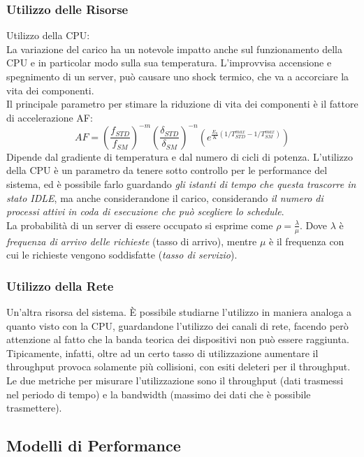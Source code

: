 \documentclass{article}
\begin{document}
		\subsubsection{Utilizzo delle Risorse}\label{utilizzo-delle-risorse}
		Utilizzo della CPU:\\
		La variazione del carico ha un notevole impatto anche sul
		funzionamento della CPU e in particolar modo sulla sua
		temperatura. L'improvvisa accensione e spegnimento di un
		server, può causare uno shock termico, che va a
		accorciare la vita dei componenti.\\
		Il principale parametro per stimare la riduzione di vita dei componenti è il fattore di accelerazione AF:
		\[
		AF = (\frac{f_{STD}}{f_{SM}})^{-m} (\frac{\delta_{STD}}{\delta_{SM}})^{-n}  (e^{\frac{E_a}{K}(1/T^{max}_{STD}-1/T^{max}_{SM})})
		\]
		Dipende dal gradiente di temperatura e dal numero di cicli di potenza.
		L'utilizzo della CPU è un parametro da tenere sotto controllo per le performance del sistema,
		ed è possibile farlo guardando \emph{gli istanti di tempo che questa
		trascorre in stato IDLE}, ma anche considerandone il carico,
		considerando \emph{il numero di processi attivi in coda di esecuzione
		che può scegliere lo schedule}.\\
		La probabilità di un server di essere occupato si esprime come
		\(\rho = \frac{\lambda}{\mu}\). Dove \(\lambda\) è \emph{frequenza di
		arrivo delle richieste} (tasso di arrivo), mentre \(\mu\) è il
		frequenza con cui le richieste vengono soddisfatte (\emph{tasso
		di servizio}).\\
		
		\subsubsection{Utilizzo della Rete}
		Un'altra risorsa del sistema. È possibile studiarne l'utilizzo in
		maniera analoga a quanto visto con la CPU, guardandone
		l'utilizzo dei canali di rete, facendo però attenzione
		al fatto che la banda teorica dei dispositivi non può essere
		raggiunta. Tipicamente, infatti, oltre ad un certo tasso di utilizzazione aumentare il throughput provoca solamente più collisioni, con esiti deleteri per il throughput. Le due metriche per misurare l'utilizzazione sono il throughput (dati trasmessi nel periodo di tempo) e la bandwidth (massimo dei dati che è possibile trasmettere).
		
		\subsection{Modelli di Performance}\label{modelli-di-performance}
\end{document}
